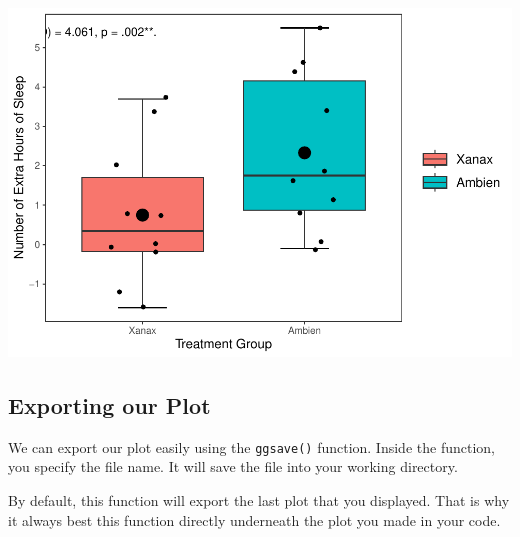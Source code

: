 \documentclass[
]{book}
\begin{document}
\includegraphics{rintro_demo_files/figure-latex/unnamed-chunk-304-1.pdf}

\hypertarget{exporting-our-plot}{%
\subsection{Exporting our Plot}\label{exporting-our-plot}}

We can export our plot easily using the \texttt{ggsave()} function. Inside the function, you specify the file name. It will save the file into your working directory.

By default, this function will export the last plot that you displayed. That is why it always best this function directly underneath the plot you made in your code.
\end{document}
